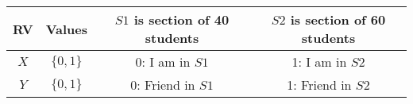 
\begin{center}
\begin{tabular}{|c|c|c|c|}
\hline
\textbf{RV}& \textbf{Values} & \textbf{$S1$ is section of 40 students} &\textbf{$S2$ is section of 60 students} \\ \hline
$X$		   & 	$\{0,1\}$		&   0: I am in $S1$      & 1: I am in $S2$\\ \hline
$Y$ 		   & 	$\{0,1\}$	&	0: Friend in $S1$    & 1: Friend in $S2$\\ \hline
\end{tabular}
\end{center}